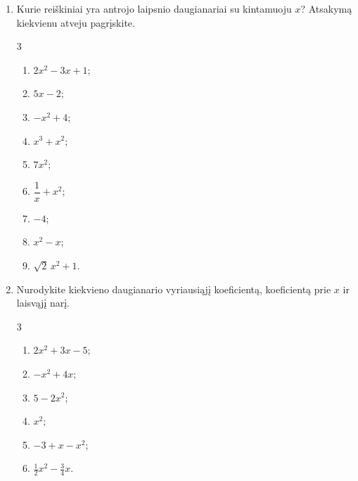 \documentclass[12pt,a4paper]{exam}
\begin{document}
\begin{enumerate}
\item Kurie reiškiniai yra antrojo laipsnio daugianariai su kintamuoju $x$? Atsakymą kiekvienu atveju pagrįskite.
\begin{multicols}{3}
\begin{enumerate}
\item $2x^2-3x+1$;
\item $5x-2$;
\item $-x^2+4$;
\item $x^3+x^2$;
\item $7x^2$;
\item $\dfrac1x+x^2$;
\item $-4$;
\item $x^2-x$;
\item $\sqrt2\,x^2+1$.
\end{enumerate}
\end{multicols}
\item Nurodykite kiekvieno daugianario vyriausiąjį koeficientą, koeficientą prie $x$ ir laisvąjį narį.
\begin{multicols}{3}
\begin{enumerate}
\item $2x^2+3x-5$;
\item $-x^2+4x$;
\item $5-2x^2$;
\item $x^2$;
\item $-3+x-x^2$;
\item $\frac{1}{2}x^2-\frac{3}{4}x$.
\end{enumerate}
\end{multicols}


\end{enumerate}
\end{document}
